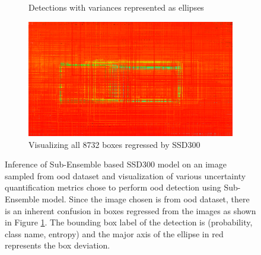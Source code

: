 \begin{figure}[ht]
\begin{subfigure}[t]{0.495\textwidth}
    		\caption{Detections with variances represented as ellipses}
    	\end{subfigure}
    	\begin{subfigure}[t]{0.495\textwidth}
    		\centering
    		\includegraphics[width=\textwidth]{images/det_images/all_subens_idd_0.png}
    		\caption{Visualizing all 8732 boxes regressed by SSD300}
    		\label{od_subens_8732_boxes}
    	\end{subfigure}
    	
    	\caption[Sub-Ensemble models inference on image from \acrshort{idd} dataset]{Inference of Sub-Ensemble based SSD300 model on an image sampled from \acrshort{ood} dataset and visualization of various uncertainty quantification metrics chose to perform \acrshort{ood} detection using Sub-Ensemble model. Since the image chosen is from \acrshort{ood} dataset, there is an inherent confusion in boxes regressed from the images as shown in Figure \ref{od_subens_8732_boxes}. The bounding box label of the detection is (probability, class name, entropy) and the major axis of the ellipse in red represents the box deviation.}
    	\label{sens_inference_oodd}
    \end{figure}
    
